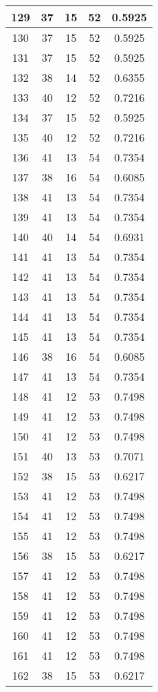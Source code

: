 \documentclass[letterpaper, 12pt]{article}
\begin{document}
\begin{longtable}{|c|c|c|c|c|}
\hline
129 & 37 & 15 & 52 & 0.5925 \\
\hline
130 & 37 & 15 & 52 & 0.5925 \\
\hline
131 & 37 & 15 & 52 & 0.5925 \\
\hline
132 & 38 & 14 & 52 & 0.6355 \\
\hline
133 & 40 & 12 & 52 & 0.7216 \\
\hline
134 & 37 & 15 & 52 & 0.5925 \\
\hline
135 & 40 & 12 & 52 & 0.7216 \\
\hline
136 & 41 & 13 & 54 & 0.7354 \\
\hline
137 & 38 & 16 & 54 & 0.6085 \\
\hline
138 & 41 & 13 & 54 & 0.7354 \\
\hline
139 & 41 & 13 & 54 & 0.7354 \\
\hline
140 & 40 & 14 & 54 & 0.6931 \\
\hline
141 & 41 & 13 & 54 & 0.7354 \\
\hline
142 & 41 & 13 & 54 & 0.7354 \\
\hline
143 & 41 & 13 & 54 & 0.7354 \\
\hline
144 & 41 & 13 & 54 & 0.7354 \\
\hline
145 & 41 & 13 & 54 & 0.7354 \\
\hline
146 & 38 & 16 & 54 & 0.6085 \\
\hline
147 & 41 & 13 & 54 & 0.7354 \\
\hline
148 & 41 & 12 & 53 & 0.7498 \\
\hline
149 & 41 & 12 & 53 & 0.7498 \\
\hline
150 & 41 & 12 & 53 & 0.7498 \\
\hline
151 & 40 & 13 & 53 & 0.7071 \\
\hline
152 & 38 & 15 & 53 & 0.6217 \\
\hline
153 & 41 & 12 & 53 & 0.7498 \\
\hline
154 & 41 & 12 & 53 & 0.7498 \\
\hline
155 & 41 & 12 & 53 & 0.7498 \\
\hline
156 & 38 & 15 & 53 & 0.6217 \\
\hline
157 & 41 & 12 & 53 & 0.7498 \\
\hline
158 & 41 & 12 & 53 & 0.7498 \\
\hline
159 & 41 & 12 & 53 & 0.7498 \\
\hline
160 & 41 & 12 & 53 & 0.7498 \\
\hline
161 & 41 & 12 & 53 & 0.7498 \\
\hline
162 & 38 & 15 & 53 & 0.6217 \\

\end{longtable}
\end{document}
